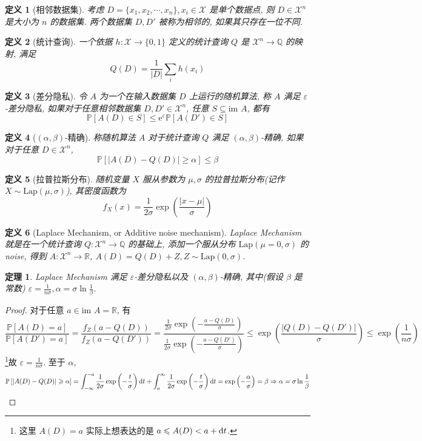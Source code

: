 \documentclass[8pt]{article}
\theoremstyle{compact}
\newtheorem{theorem}{定理}[section]
\newtheorem{definition}{定义}[section]
\def\le{\leqslant}
\def\ge{\geqslant}
\def\im{\text{im }}
\def\P#1{\mathbb{P}\left[{#1}\right]}
\def\e{\mathrm{e}}
\begin{document}
\begin{definition}[相邻数据集]
	考虑 $D = \{x_1, x_2, \cdots, x_n\}, x_i \in \mathcal X$ 是单个数据点, 则 $D \in \mathcal X^n$ 是大小为 $n$ 的数据集. 两个数据集 $D, D'$ 被称为相邻的, 如果其只存在一位不同.
\end{definition}
\begin{definition}[统计查询]
	一个依据 $h: \mathcal X \to \{0, 1\}$ 定义的统计查询 $Q$ 是 $\mathcal X^n \to \mathbb Q$ 的映射, 满足 $$Q(D) = \frac{1}{|D|} \sum_i h(x_i)$$
\end{definition}
\begin{definition}[差分隐私]
	令 $A$ 为一个在输入数据集 $D$ 上运行的随机算法, 称 $A$ 满足 $\varepsilon$-差分隐私, 如果对于任意相邻数据集 $D, D' \in \mathcal X^n$, 任意 $S \subseteq \im A$, 都有 $$\P{A(D) \in S} \le \e^{\varepsilon}\P{A(D') \in S}$$
\end{definition}
\begin{definition}[$(\alpha, \beta)$-精确]
	称随机算法 $A$ 对于统计查询 $Q$ 满足 $(\alpha, \beta)$-精确, 如果对于任意 $D \in \mathcal X^n$, $$\P{|A(D) - Q(D)| \ge \alpha} \le \beta$$
\end{definition}
\begin{definition}[拉普拉斯分布]
	随机变量 $X$ 服从参数为 $\mu, \sigma$ 的拉普拉斯分布(记作 $X \sim \text{Lap}(\mu, \sigma)$), 其密度函数为 $$f_X(x) = \frac{1}{2\sigma}\exp\left(\frac{|x-\mu|}{\sigma}\right)$$
\end{definition}
\begin{definition}[Laplace Mechanism, or Additive noise mechanism]
	Laplace Mechanism 就是在一个统计查询 $Q: \mathcal X^n \to \mathbb Q$ 的基础上, 添加一个服从分布 $\text{Lap}(\mu = 0, \sigma)$ 的noise, 得到 $A: \mathcal X^n \to \mathbb R$, $A(D) = Q(D) + Z, Z \sim \text{Lap}(0, \sigma)$.
\end{definition}
\begin{theorem}
	Laplace Mechanism 满足 $\varepsilon$-差分隐私以及 $(\alpha, \beta)$-精确, 其中(假设 $\beta$ 是常数) $\varepsilon = \frac{1}{n\sigma}, \alpha = \sigma \ln \frac{1}{\beta}$.
\end{theorem}
\begin{proof}
	对于任意 $a \in \im A = \mathbb R$, 有 $$\frac{\P{A(D) = a}}{\P{A(D') = a}} = \frac{f_Z(a - Q(D))}{f_Z(a - Q(D'))} = \frac{\frac{1}{2\sigma}\exp\left(-\frac{a-Q(D)}{\sigma}\right)}{\frac{1}{2\sigma}\exp\left(-\frac{a-Q(D')}{\sigma}\right)} \le \exp\left(\frac{|Q(D) - Q(D')|}{\sigma}\right) \le \exp\left(\frac{1}{n\sigma}\right)$$ \footnote{这里 $A(D) = a$ 实际上想表达的是 $a \le A(D) < a + \text dt$.}故 $\varepsilon = \frac{1}{n \sigma}$. 至于 $\alpha$, 
	$$\P{|A(D) - Q(D)| \ge \alpha} = \int_{-\infty}^{-a}\frac{1}{2\sigma}\exp\left(-\frac t{\sigma}\right)\text dt + \int_a^{\infty}\frac{1}{2\sigma}\exp\left(-\frac t{\sigma}\right)\text dt = \exp\left(-\frac{\alpha}{\sigma}\right) = \beta \Rightarrow \alpha = \sigma \ln \frac{1}{\beta}$$
\end{proof}
\end{document}
